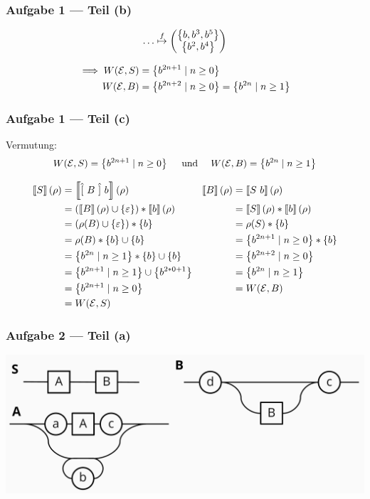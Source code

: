\documentclass{beamer}
\newcommand{\byp}[1]{\hat{[} \ #1 \ \hat{]}}
\newcommand{\sem}[1]{\left\llbracket #1 \right\rrbracket}
\begin{document}
\begin{frame} \frametitle{Aufgabe 1 --- Teil (b)}
	\begin{align*}
		\dots \overset{f}{\mapsto}
		\begin{pmatrix} \left\{ b,b^3,b^5 \right\} \\ \left\{ b^2,b^4 \right\} \end{pmatrix}
	\end{align*}
	
	\pause
	
	\begin{align*}
	\implies W(\mathcal{E},S) &= \left\{ b^{2n+1} \mid n \ge 0 \right\}  \\
	W(\mathcal{E},B) &= \left\{ b^{2n+2} \mid n \ge 0 \right\} = \left\{ b^{2n} \mid n \ge 1 \right\}
	\end{align*}
\end{frame}

\begin{frame} \frametitle{Aufgabe 1 --- Teil (c)}
	\small 
	Vermutung: 
	\begin{align*}
		W(\mathcal{E},S) = \left\{ b^{2n+1} \mid n \ge 0 \right\}  \quad \text{ und } \quad
		W(\mathcal{E},B) = \left\{ b^{2n} \mid n \ge 1 \right\}
	\end{align*}
	
	\pause
		
	\begin{align*}
	  \sem{S}(\rho) & = \sem{\byp{B} \ b}(\rho) & 											\sem{B}(\rho) & = \sem{S \ b}(\rho) \\
					& = \brackets{\sem{B}(\rho) \cup \menge{\epsilon}} * \sem{b}(\rho) &			      & = \sem{S}(\rho) * \sem{b}(\rho) \\
					& = \brackets{\rho(B) \cup \menge{\epsilon}} * \menge{b} &							  & = \rho(S) * \menge{b} \\
					& = \rho(B) * \menge{b} \cup \menge{b} &											  & = \menge{b^{2n+1} \mid n \ge 0} * \menge{b} \\ 			
					& = \menge{b^{2n} \mid n \ge 1} * \menge{b} \cup \menge{b} &						  & = \menge{b^{2n+2} \mid n \ge 0} \\	
					& = \menge{b^{2n+1} \mid n \ge 1} \cup \menge{b^{2*0+1}} & 						      & = \menge{b^{2n} \mid n \ge 1} \\
					& = \menge{b^{2n+1} \mid n \ge 0} &													  & = W(\mathcal{E},B) \\
					& = W(\mathcal{E},S)
	\end{align*}
\end{frame}

\begin{frame} \frametitle{Aufgabe 2 --- Teil (a)}
	\centering
	\includegraphics[width=\textwidth]{tut04_syntax_dia_2a.jpg}
\end{frame}
\end{document}

